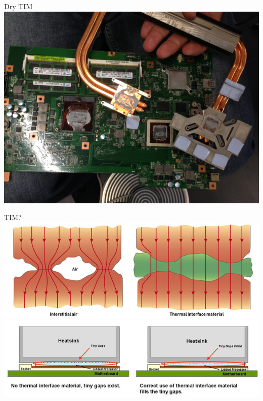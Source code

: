 \documentclass{beamer}
\begin{document}
\begin{frame}{Dry TIM}
    \centering
    \includegraphics[scale=0.08]{dry-tim}
\end{frame}

\begin{frame}{TIM?}
    \centering
    \includegraphics[scale=0.5]{tim-air}
    \newline
    \newline
    \includegraphics[scale=0.5]{heatsink-tim-cpu}
\end{frame}
\end{document}
